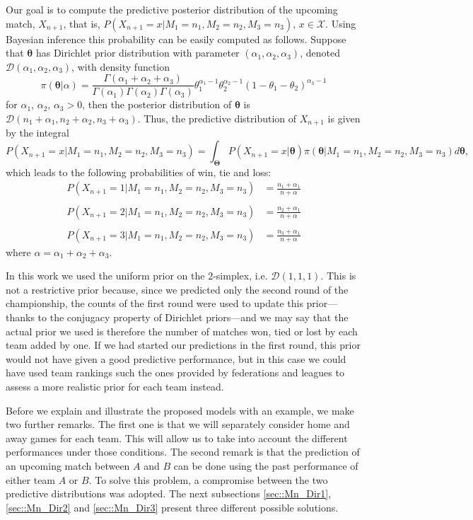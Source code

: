 \documentclass[journal,article,accept,moreauthors,pdftex,12pt,a4paper]{mdpi}
\begin{document}
Our goal is to compute the predictive posterior distribution of the
upcoming match, $X_{n+1}$, that is,
$P(X_{n+1}=x|M_1=n_1,M_2=n_2,M_3=n_3)$, $x\in\mathcal{X}$. Using
Bayesian inference this probability can be easily computed as
follows. Suppose that $\boldsymbol{\theta}$ has Dirichlet prior distribution
with parameter $(\alpha_1,\alpha_2,\alpha_3)$, denoted
$\mathcal{D}(\alpha_1,\alpha_2,\alpha_3)$, with density function
\[
\pi(\boldsymbol{\theta}|\alpha)=\frac{\Gamma(\alpha_1+\alpha_2+\alpha_3)}{\Gamma(\alpha_1)\Gamma(\alpha_2)\Gamma(\alpha_3)}\theta_1^{\alpha_1-1}\theta_2^{\alpha_2-1}(1-\theta_1-\theta_2)^{\alpha_3-1}
\]
\noindent for $\alpha_1$, $\alpha_2$, $\alpha_3 > 0$, then the
posterior distribution of $\boldsymbol{\theta}$ is
$\mathcal{D}(n_1+\alpha_1,n_2+\alpha_2,n_3+\alpha_3)$. Thus, the
predictive distribution of $X_{n + 1}$ is given by the
integral
$$
P(X_{n + 1} = x | M_1 = n_1, M_2 = n_2, M_3 = n_3) = \int_{\boldsymbol{\Theta}} P(X_{n
+ 1} = x | \boldsymbol{\theta}) \pi(\boldsymbol{\theta} | M_1 = n_1, M_2 = n_2, M_3
= n_3) d\boldsymbol{\theta},
$$
which leads to the following probabilities of win, tie and loss:
\begin{align*}
P(X_{n+1} = 1 | M_1=n_1,M_2=n_2,M_3=n_3) &=
\frac{n_1+\alpha_1}{n+\alpha}\\
& \\
P(X_{n+1} = 2 | M_1=n_1,M_2=n_2,M_3=n_3) &=
\frac{n_2+\alpha_1}{n+\alpha} \\
& \\
P(X_{n+1} = 3 | M_1=n_1, M_2=n_2, M_3=n_3) &=
\frac{n_3+\alpha_1}{n+\alpha}
\end{align*}
\noindent where $\alpha=\alpha_1+\alpha_2+\alpha_3$.

In this work we used the uniform prior on the 2-simplex, i.e. $\mathcal{D}(1,1,1)$. 
This is not a restrictive prior because, since we predicted only the second round of the championship, the counts of the first round were used to update this prior---thanks to the conjugacy property of Dirichlet priors---and we may say that the actual prior we used is therefore the number of matches won, tied or lost by each team added by one.
If we had started our predictions in the first round, this prior would not have given 
a good predictive performance, but in this case we could have used team rankings such the ones provided by federations and leagues to assess a more realistic prior for each team instead.

Before we explain and illustrate the proposed models with an example, we make two further remarks.
The first one is that we will separately consider home and away games for each team. This will allow us to take into account the different performances under those conditions.
The second remark is that the prediction of an upcoming match between $A$ and $B$ can be done using
the past performance of either team $A$ or $B$.
To solve this problem, a compromise between the two predictive distributions was adopted. 
The next subsections \ref{sec::Mn_Dir1}, \ref{sec::Mn_Dir2} and \ref{sec::Mn_Dir3} present three different possible solutions.
\end{document}
